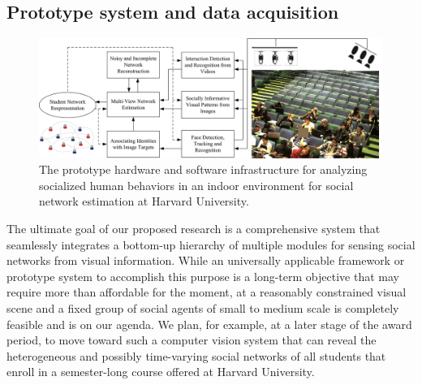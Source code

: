 \subsection{Prototype system and data acquisition}
\label{sec:sys}

\begin{figure}[t!]
\begin{center}
\includegraphics[width=\columnwidth]{prototype_1}
\end{center}
\vspace{-0.25in} \caption{\captionsize 
The prototype hardware and software infrastructure for analyzing socialized human behaviors in an indoor environment for social network estimation at Harvard University.\label{fig:prototype}\afterfigspace}
\end{figure}

The ultimate goal of our proposed research is a comprehensive system that seamlessly integrates a bottom-up hierarchy of multiple modules for sensing social networks from visual information. While an universally applicable framework or prototype system to accomplish this purpose is a long-term objective that may require more than affordable for the moment, at a reasonably constrained visual scene and a fixed group of social agents of small to medium scale is completely feasible and is on our agenda. We plan, for example, at a later stage of the award period, to move toward such a computer vision system that can reveal the heterogeneous and possibly time-varying social networks of all students that enroll in a semester-long course offered at Harvard University. 


